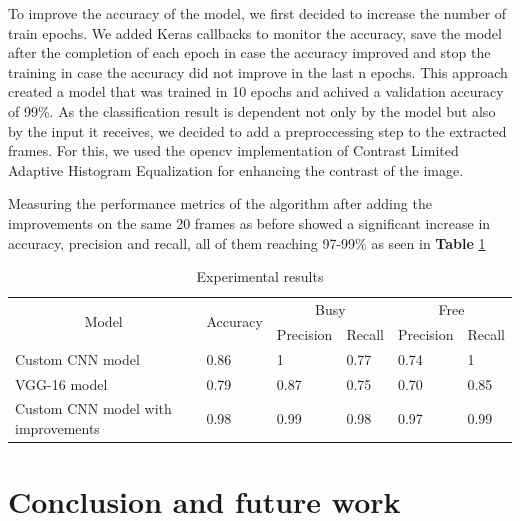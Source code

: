 \documentclass[runningheads,a4paper,11pt]{report}
\begin{document}
To improve the accuracy of the model, we first decided to increase the number of train epochs. We added Keras callbacks to monitor the accuracy, save the model after the completion of each epoch in case the accuracy improved and stop the training in case the accuracy did not improve in the last n epochs. This approach created a model that was trained in 10 epochs and achived a validation accuracy of 99\%.
As the classification result is dependent not only by the model but also by the input it receives, we decided to add a preproccessing step to the extracted frames. For this, we used the opencv implementation of Contrast Limited Adaptive Histogram Equalization for enhancing the contrast of the image.

Measuring the performance metrics of the algorithm after adding the improvements on the same 20 frames as before showed a significant increase in accuracy, precision and recall, all of them reaching 97-99\% as seen in \textbf{Table} \ref{tab:metrics}

\begin{table}[htb]
  \begin{centering}
  \begin{tabular}{|l|l|l|l|l|l|}
  \hline
  \multicolumn{1}{|c|}{\multirow{2}{*}{Model}} & \multirow{2}{*}{Accuracy} & \multicolumn{2}{c|}{Busy} & \multicolumn{2}{c|}{Free} \\ \cline{3-6} 
  \multicolumn{1}{|c|}{}                       &                           & Precision     & Recall    & Precision     & Recall    \\ \hline
  Custom CNN model                             & 0.86                      & 1             & 0.77      & 0.74          & 1         \\ \hline
  VGG-16 model                                 & 0.79                      & 0.87          & 0.75      & 0.70          & 0.85    \\ \hline
  Custom CNN model with improvements           & 0.98                      & 0.99          & 0.98      & 0.97          & 0.99      \\ \hline
  \end{tabular}
  \caption{Experimental results}
  \label{tab:metrics}
  \end{centering}
\end{table}

\chapter{Conclusion and future work}
\label{chapter:concl}
\end{document}
